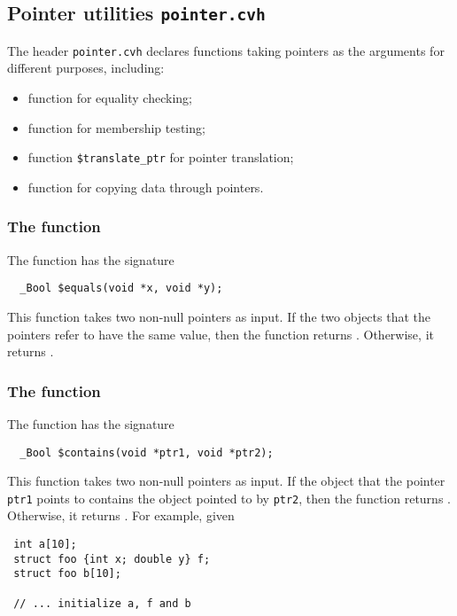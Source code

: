 \subsection{Pointer utilities \texttt{pointer.cvh}}
\label{subsec:pointerLibrary}
The header \texttt{pointer.cvh} declares functions taking pointers as the arguments for different purposes, including:
\begin{itemize}
\item function \cequals{} for equality checking;
\item function \ccontains{} for membership testing;
\item function \texttt{\$translate\_ptr} for pointer translation;
\item function \ccopy{} for copying data through pointers.
\end{itemize}

\subsubsection{The \cequals{} function}

The \cequals{} function has the signature
\begin{verbatim}
  _Bool $equals(void *x, void *y);
\end{verbatim}

This function takes two non-null pointers as input. If  the two objects that the pointers refer to have the same value, then the
function returns \ctrue. Otherwise, it returns \cfalse.

\subsubsection{The \ccontains{} function}

The function \ccontains{} has the signature
\begin{verbatim}
  _Bool $contains(void *ptr1, void *ptr2);
\end{verbatim}

This function takes two non-null pointers as input. If  the object that the pointer \texttt{ptr1} points to contains the object pointed to by \texttt{ptr2},  then the
function returns \ctrue. Otherwise, it returns \cfalse. For example, given 
\begin{verbatim}
 int a[10];
 struct foo {int x; double y} f;
 struct foo b[10];

 // ... initialize a, f and b
\end{verbatim}

